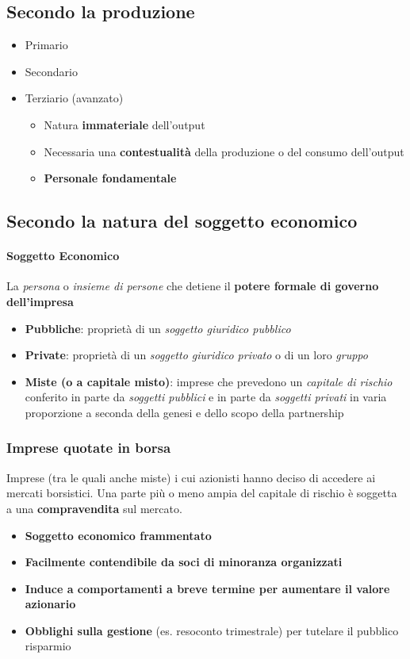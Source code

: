 \documentclass[12pt]{article}
\begin{document}
\subsection{Secondo la produzione}
\begin{itemize}
    \item Primario
    \item Secondario
    \item Terziario (avanzato)
          \begin{itemize}
              \item Natura \textbf{immateriale} dell'output
              \item Necessaria una \textbf{contestualità} della produzione o del consumo dell'output
              \item \textbf{Personale fondamentale}
          \end{itemize}
\end{itemize}
\subsection{Secondo la natura del soggetto economico}
\paragraph{Soggetto Economico} La \textit{persona} o \textit{insieme di persone} che detiene il \textbf{potere formale di governo dell'impresa}
\begin{itemize}
    \item \textbf{Pubbliche}: proprietà di un \textit{soggetto giuridico pubblico}
    \item \textbf{Private}: proprietà di un \textit{soggetto giuridico privato} o di un loro \textit{gruppo}
    \item \textbf{Miste (o a capitale misto)}: imprese che prevedono un \textit{capitale di rischio} conferito in parte da \textit{soggetti pubblici} e in parte da \textit{soggetti privati} in varia proporzione a seconda della genesi e dello scopo della partnership
\end{itemize}
\subsubsection{Imprese quotate in borsa}
Imprese (tra le quali anche miste) i cui azionisti hanno deciso di accedere ai mercati borsistici. Una parte più o meno ampia del capitale di rischio è soggetta a una \textbf{compravendita} sul mercato.
\begin{itemize}
    \item \textbf{Soggetto economico frammentato}
    \item \textbf{Facilmente contendibile da soci di minoranza organizzati}
    \item \textbf{Induce a comportamenti a breve termine per aumentare il valore azionario}
    \item \textbf{Obblighi sulla gestione} (es. resoconto trimestrale) per tutelare il pubblico risparmio
\end{itemize}
\end{document}
